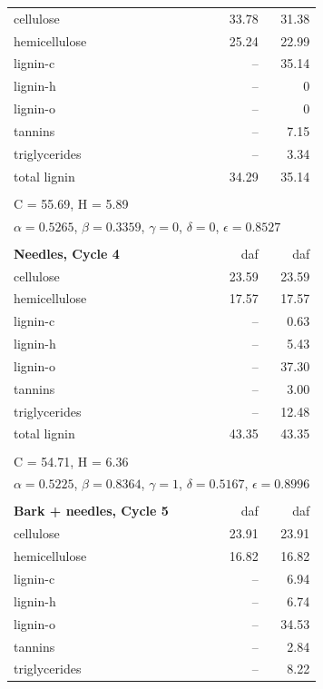 \documentclass[12pt,titlepage]{article}
\begin{document}
\begin{longtable}{p{8cm}rr}
    \midrule
    cellulose     & 33.78 & 31.38 \\
    hemicellulose & 25.24 & 22.99 \\
    lignin-c      & --    & 35.14 \\
    lignin-h      & --    & 0 \\
    lignin-o      & --    & 0 \\
    tannins       & --    & 7.15 \\
    triglycerides & --    & 3.34 \\
    total lignin  & 34.29 & 35.14 \\
    \\
    \multicolumn{3}{l}{C = 55.69, H = 5.89} \\
    \multicolumn{3}{l}{$\alpha = 0.5265$, $\beta = 0.3359$, $\gamma = 0$, $\delta = 0$, $\epsilon = 0.8527$} \\
    \\
    \textbf{Needles, Cycle 4} & daf & daf \\
    \midrule
    cellulose     & 23.59 & 23.59 \\
    hemicellulose & 17.57 & 17.57 \\
    lignin-c      & --    & 0.63 \\
    lignin-h      & --    & 5.43 \\
    lignin-o      & --    & 37.30 \\
    tannins       & --    & 3.00 \\
    triglycerides & --    & 12.48 \\
    total lignin  & 43.35 & 43.35 \\
    \\
    \multicolumn{3}{l}{C = 54.71, H = 6.36} \\
    \multicolumn{3}{l}{$\alpha = 0.5225$, $\beta = 0.8364$, $\gamma = 1$, $\delta = 0.5167$, $\epsilon = 0.8996$} \\
    \\
    \textbf{Bark + needles, Cycle 5} & daf & daf \\
    \midrule
    cellulose     & 23.91 & 23.91 \\
    hemicellulose & 16.82 & 16.82 \\
    lignin-c      & --    & 6.94 \\
    lignin-h      & --    & 6.74 \\
    lignin-o      & --    & 34.53 \\
    tannins       & --    & 2.84 \\
    triglycerides & --    & 8.22 \\

\end{longtable}
\end{document}
